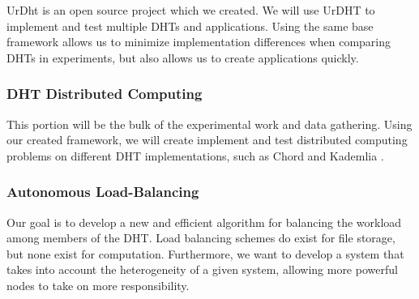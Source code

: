 UrDht is an open source project which we created.
We will use UrDHT to implement and test multiple DHTs and applications.
Using the same base framework allows us to minimize implementation differences when comparing DHTs in experiments, but also allows us to create applications quickly.



\subsubsection{DHT Distributed Computing}

This portion will be the bulk of the experimental work and data gathering.
Using our created framework, we will create implement and test distributed computing problems on different DHT implementations, such as Chord \cite{chord} and Kademlia \cite{kademlia}.

\subsubsection{Autonomous Load-Balancing}
Our goal is to develop a new and efficient algorithm for balancing the workload among members of the DHT.
Load balancing schemes do exist for file storage, but none exist for computation.
Furthermore, we want to develop a system that takes into account the heterogeneity of a given system, allowing more powerful nodes to take on more responsibility.








